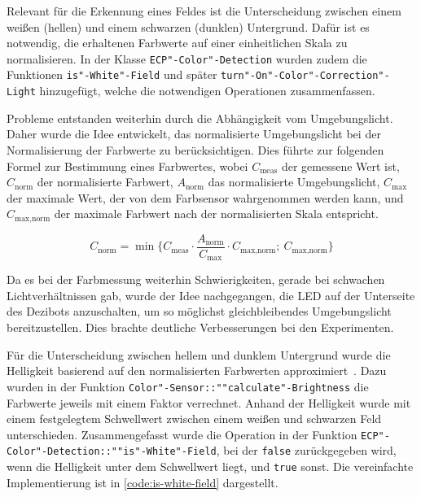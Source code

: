 Relevant für die Erkennung eines Feldes ist die Unterscheidung zwischen einem weißen (hellen) und einem schwarzen (dunklen) Untergrund. Dafür ist es notwendig, die erhaltenen Farbwerte auf einer einheitlichen Skala zu normalisieren. In der Klasse \texttt{ECP"-Color"-Detection} wurden zudem die Funktionen \texttt{is"-White"-Field} und später \texttt{turn"-On"-Color"-Correction"-Light} hinzugefügt, welche die notwendigen Operationen zusammenfassen.

Probleme entstanden weiterhin durch die Abhängigkeit vom Umgebungslicht. Daher wurde die Idee entwickelt, das normalisierte Umgebungslicht bei der Normalisierung der Farbwerte zu berücksichtigen. Dies führte zur folgenden Formel zur Bestimmung eines Farbwertes, wobei $C_{\text{meas}}$ der gemessene Wert ist, $C_{\text{norm}}$ der normalisierte Farbwert, $A_{\text{norm}}$ das normalisierte Umgebungslicht, $C_{\text{max}}$ der maximale Wert, der von dem Farbsensor wahrgenommen werden kann, und $C_{\text{max,norm}}$ der maximale Farbwert nach der normalisierten Skala entspricht.

\begin{equation*}
    C_{\text{norm}} = \min\Big\{C_{\text{meas}} \cdot \frac{A_{\text{norm}}}{C_{\text{max}}} \cdot C_{\text{max,norm}}; ~C_{\text{max,norm}}\Big\}
\end{equation*}

Da es bei der Farbmessung weiterhin Schwierigkeiten, gerade bei schwachen Lichtverhältnissen gab, wurde der Idee nachgegangen, die LED auf der Unterseite des Dezibots anzuschalten, um so möglichst gleichbleibendes Umgebungslicht bereitzustellen. Dies brachte deutliche Verbesserungen bei den Experimenten.

Für die Unterscheidung zwischen hellem und dunklem Untergrund wurde die Helligkeit basierend auf den normalisierten Farbwerten approximiert~\cite[vgl.][Kapitel~2.2.]{ridpathTechniquesAccessibilityEvaluation2000}.
Dazu wurden in der Funktion \texttt{Color"-Sensor::""calculate"-Brightness} die Farbwerte jeweils mit einem Faktor verrechnet. Anhand der Helligkeit wurde mit einem festgelegtem Schwellwert zwischen einem weißen und schwarzen Feld unterschieden. Zusammengefasst wurde die Operation in der Funktion \texttt{ECP"-Color"-Detection::""is"-White"-Field}, bei der \texttt{false} zurückgegeben wird, wenn die Helligkeit unter dem Schwellwert liegt, und \texttt{true} sonst. Die vereinfachte Implementierung ist in \autoref{code:is-white-field} dargestellt.

\begin{listing}[h]
    \inputminted{cpp}{../assets/code/ECPColorDetection-isWhiteField.cpp}
    \caption{Vereinfachter Code"=Ausschnitt zur \texttt{ECP"-Color"-Detection::""is"-White"-Field}"=Funktion.}
    \label{code:is-white-field}
\end{listing}

